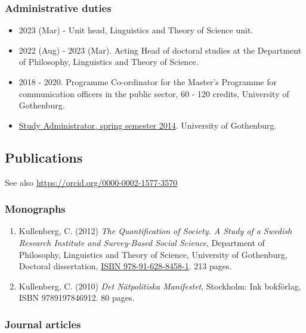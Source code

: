 \documentclass[
]{article}
\providecommand{\tightlist}{%
  \setlength{\itemsep}{0pt}\setlength{\parskip}{0pt}}
\begin{document}
\hypertarget{administrative-duties}{%
\subsubsection{Administrative duties}\label{administrative-duties}}

\begin{itemize}
\tightlist
\item
  2023 (Mar) - Unit head, Linguistics and Theory of Science unit.
\item
  2022 (Aug) - 2023 (Mar). Acting Head of doctoral studies at the
  Department of Philosophy, Linguistics and Theory of Science.
\item
  2018 - 2020. Programme Co-ordinator for the Master's Programme for
  communication officers in the public sector, 60 - 120 credits,
  University of Gothenburg.
\item
  \href{http://files.christopherkullenberg.se/studierektoronline.pdf}{Study
  Administrator, spring semester 2014}. University of Gothenburg.
\end{itemize}

\hypertarget{publications}{%
\subsection{Publications}\label{publications}}

See also \url{https://orcid.org/0000-0002-1577-3570}

\hypertarget{monographs}{%
\subsubsection{Monographs}\label{monographs}}

\begin{enumerate}
\def\labelenumi{\arabic{enumi}.}
\tightlist
\item
  Kullenberg, C. (2012) \emph{The Quantification of Society. A Study of
  a Swedish Research Institute and Survey-Based Social Science},
  Department of Philosophy, Linguistics and Theory of Science,
  University of Gothenburg, Doctoral dissertation,
  \href{https://gupea.ub.gu.se/handle/2077/28807}{ISBN
  978-91-628-8458-1}. 213 pages.
\item
  Kullenberg, C. (2010) \emph{Det Nätpolitiska Manifestet}, Stockholm:
  Ink bokförlag, ISBN 9789197846912. 80 pages.
\end{enumerate}

\hypertarget{journal-articles}{%
\subsubsection{Journal articles}\label{journal-articles}}
\end{document}
